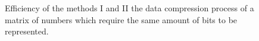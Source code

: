 \documentclass[10pt]{article}
\begin{document}
\begin{figure}[h]
  \caption{Efficiency of the methods I and II the data compression process of a matrix of numbers which require the same amount of bits to be represented.}
  \label{fig:1819}
\end{figure}
  
\end{document}
